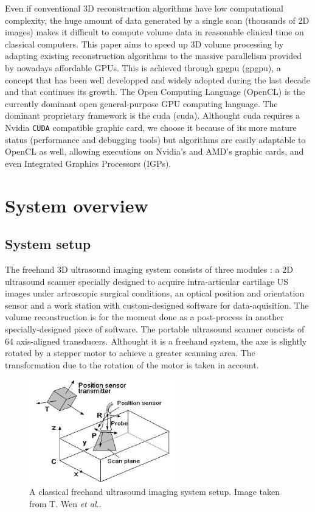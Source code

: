 \documentclass[12pt,journal,compsoc]{IEEEtran}
\begin{document}
Even if conventional 3D reconstruction algorithms have low computational complexity, the huge amount of data generated by a single scan (thousands of 2D images) makes it difficult to compute volume data in reasonable clinical time on classical computers.
This paper aims to speed up 3D volume processing by adapting existing reconstruction algorithms to the massive parallelism provided by nowadays affordable GPUs. This is achieved through \acl{gpgpu} (\ac{gpgpu}), a concept that has been well developped and widely adopted during the last decade and that continues its growth.
The Open Computing Language (OpenCL) is the currently dominant open general-purpose GPU computing language. The dominant proprietary framework is the \acl{cuda} (\ac{cuda}).
Althought \ac{cuda} requires a Nvidia \texttt{CUDA} compatible graphic card, we choose it because of its more mature status (performance and debugging tools) but algorithms are easily adaptable to OpenCL as well, allowing executions on Nvidia's and AMD's graphic cards, and even Integrated Graphics Processors (IGPs).


\section{System overview}

\subsection{System setup}

The freehand 3D ultrasound imaging system consists of three modules : a 2D ultrasound scanner specially designed to acquire intra-articular cartilage US images under artroscopic surgical conditions, an optical position and orientation sensor and a work station with custom-designed software for data-aquisition. The volume reconstruction is for the moment done as a post-process in another specially-designed piece of software.
The portable ultrasound scanner concists of 64 axis-aligned transducers. Althought it is a freehand system, the axe is slightly rotated by a stepper motor to achieve a greater scanning area. The transformation due to the rotation of the motor is taken in account.

\begin{figure}[!h]
\centering
\includegraphics[width=2.5in]{freehand}
\caption{A classical freehand ultrasound imaging system setup. Image taken from T. Wen \textit{et al.}\cite{2}.}
\label{fig_1}
\end{figure}
\end{document}
